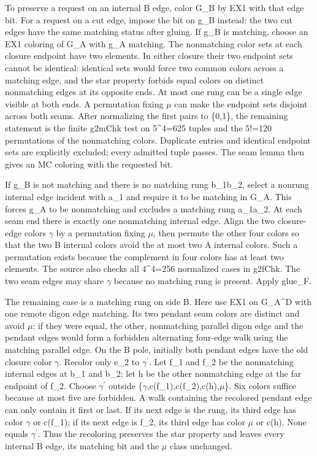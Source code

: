\documentclass[11pt,a4paper]{article}
\begin{document}
To preserve a request on an internal B edge, color G\_B by EX1 with that edge bit. For a request on a cut edge, impose the bit on g\_B instead: the two cut edges have the same matching status after gluing. If g\_B is matching, choose an EX1 coloring of G\_A with g\_A matching. The nonmatching color sets at each closure endpoint have two elements. In either closure their two endpoint sets cannot be identical: identical sets would force two common colors across a matching edge, and the star property forbids equal colors on distinct nonmatching edges at its opposite ends. At most one rung can be a single edge visible at both ends. A permutation fixing \ensuremath{\mu} can make the endpoint sets disjoint across both seams. After normalizing the first pairs to \{0,1\}, the remaining statement is the finite g2mChk test on 5\textasciicircum{}4=625 tuples and the 5!=120 permutations of the nonmatching colors. Duplicate entries and identical endpoint sets are explicitly excluded; every admitted tuple passes. The seam lemma then gives an MC coloring with the requested bit.

If g\_B is not matching and there is no matching rung b\_1b\_2, select a nonrung internal edge incident with a\_1 and require it to be matching in G\_A. This forces g\_A to be nonmatching and excludes a matching rung a\_1a\_2. At each seam end there is exactly one nonmatching internal edge. Align the two closure-edge colors \ensuremath{\gamma} by a permutation fixing \ensuremath{\mu}, then permute the other four colors so that the two B internal colors avoid the at most two A internal colors. Such a permutation exists because the complement in four colors has at least two elements. The source also checks all 4\textasciicircum{}4=256 normalized cases in g2fChk. The two seam edges may share \ensuremath{\gamma} because no matching rung is present. Apply glue\_F.

The remaining case is a matching rung on side B. Here use EX1 on G\_A\textasciicircum{}D with one remote digon edge matching. Its two pendant seam colors are distinct and avoid \ensuremath{\mu}: if they were equal, the other, nonmatching parallel digon edge and the pendant edges would form a forbidden alternating four-edge walk using the matching parallel edge. On the B pole, initially both pendant edges have the old closure color \ensuremath{\gamma}. Recolor only e\_2 to \ensuremath{\gamma}\ensuremath{^{\prime}}. Let f\_1 and f\_2 be the nonmatching internal edges at b\_1 and b\_2; let h be the other nonmatching edge at the far endpoint of f\_2. Choose \ensuremath{\gamma}\ensuremath{^{\prime}} outside \{\ensuremath{\gamma},c(f\_1),c(f\_2),c(h),\ensuremath{\mu}\}. Six colors suffice because at most five are forbidden. A walk containing the recolored pendant edge can only contain it first or last. If its next edge is the rung, its third edge has color \ensuremath{\gamma} or c(f\_1); if its next edge is f\_2, its third edge has color \ensuremath{\mu} or c(h). None equals \ensuremath{\gamma}\ensuremath{^{\prime}}. Thus the recoloring preserves the star property and leaves every internal B edge, its matching bit and the \ensuremath{\mu} class unchanged.
\end{document}
